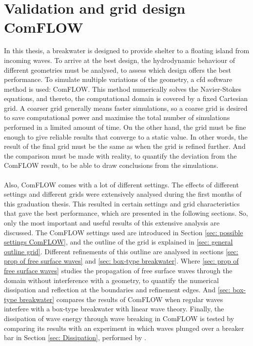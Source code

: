 \chapter{Validation and grid design ComFLOW}
\label{ch: validation comflow}
In this thesis, a breakwater is designed to provide shelter to a floating island from incoming waves. To arrive at the best design, the hydrodynamic behaviour of different geometries must be analysed, to assess which design offers the best performance. To simulate multiple variations of the geometry, a \acrshort{cfd} software method is used: ComFLOW. This method numerically solves the Navier-Stokes equations, and thereto, the computational domain is covered by a fixed Cartesian grid. A coarser grid generally means faster simulations, so a coarse grid is desired to save computational power and maximise the total number of simulations performed in a limited amount of time.  On the other hand, the grid must be fine enough to give reliable results that converge to a static value. In other words,  the result of the final grid must be the same as when the grid is refined further. And the comparison must be made with reality, to quantify the deviation from the ComFLOW result, to be able to draw conclusions from the simulations.\\
\\

Also, ComFLOW comes with a lot of different settings. The effects of different settings and different grids were extensively analysed during the first months of this graduation thesis. This resulted in certain settings and grid characteristics that gave the best performance, which are presented in the following sections. So, only the most important and useful results of this extensive analysis are discussed. The ComFLOW settings used are introduced in Section \ref{sec: possible settings ComFLOW}, and the outline of the grid is explained in \ref{sec: general outline grid}. Different refinements of this outline are analysed in sections \ref{sec: prop of free surface waves} and \ref{sec: box-type breakwater}. Where \ref{sec: prop of free surface waves} studies the propagation of free surface waves through the domain without interference with a geometry, to quantify the numerical dissipation and reflection at the boundaries and refinement edges. And \ref{sec: box-type breakwater} compares the results of ComFLOW when regular waves interfere with a box-type breakwater with linear wave theory. Finally, the dissipation of wave energy through wave breaking in ComFLOW is tested by comparing its results with an experiment in which waves plunged over a breaker bar in Section \ref{sec: Dissipation}, performed by \citet{breakerbarexperiment}.


